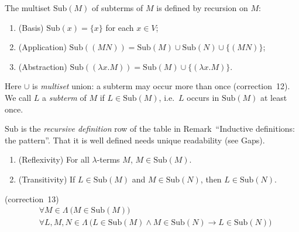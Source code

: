\documentclass[11pt]{article}
\newcommand{\Lam}{\Lambda}
\newcommand{\Var}{V}
\begin{document}
\begin{definition}\label{def:sub}
The multiset $\mathrm{Sub}(M)$ of subterms of $M$ is defined by recursion
on $M$:
\begin{enumerate}[label=(\arabic*)]
  \item (Basis) $\mathrm{Sub}(x) = \{x\}$ for each $x \in \Var$;
  \item (Application) $\mathrm{Sub}((MN)) = \mathrm{Sub}(M) \cup
        \mathrm{Sub}(N) \cup \{(MN)\}$;
  \item (Abstraction) $\mathrm{Sub}((\lambda x.M)) = \mathrm{Sub}(M) \cup
        \{(\lambda x.M)\}$.
\end{enumerate}
Here $\cup$ is \emph{multiset} union: a subterm may occur more than once
(correction~12). We call $L$ a \emph{subterm} of $M$ if
$L \in \mathrm{Sub}(M)$, i.e.\ $L$ occurs in $\mathrm{Sub}(M)$ at least once.
\end{definition}

\begin{example}
\end{example}

\begin{remark}
$\mathrm{Sub}$ is the \emph{recursive definition} row of the table in
Remark~``Inductive definitions: the pattern''. That it is well defined
needs unique readability (see Gaps).
\end{remark}

\begin{lemma}\label{lem:sub-properties}
\begin{enumerate}[label=(\arabic*)]
  \item (Reflexivity) For all $\lambda$-terms $M$, $M \in \mathrm{Sub}(M)$.
  \item (Transitivity) If $L \in \mathrm{Sub}(M)$ and
        $M \in \mathrm{Sub}(N)$, then $L \in \mathrm{Sub}(N)$.
\end{enumerate}
\end{lemma}

\begin{quantified}
(correction~13)
\begin{align*}
&\forall M \in \Lam\ \bigl(M \in \mathrm{Sub}(M)\bigr)\\
&\forall L, M, N \in \Lam\ \bigl(L \in \mathrm{Sub}(M) \land
  M \in \mathrm{Sub}(N) \to L \in \mathrm{Sub}(N)\bigr)
\end{align*}
\end{quantified}
\end{document}
